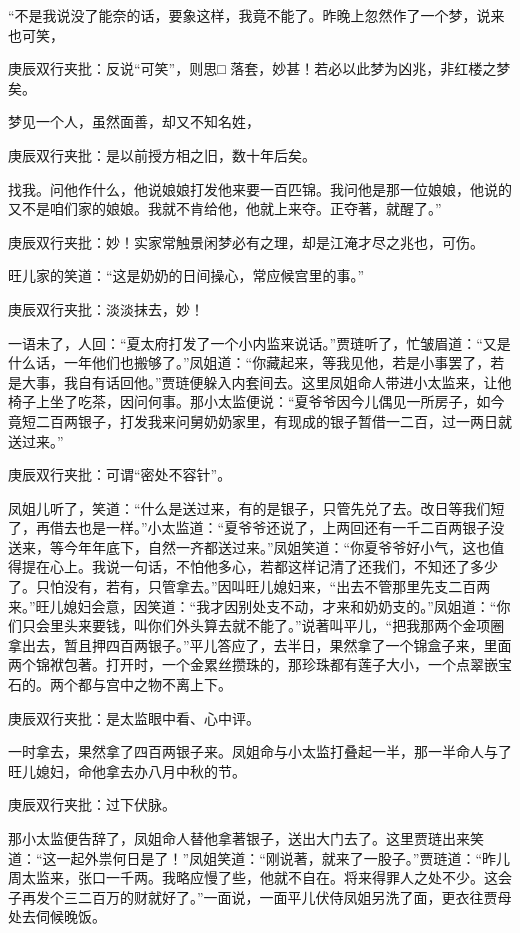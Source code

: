 \begin{parag}
“不是我说没了能奈的话，要象这样，我竟不能了。昨晚上忽然作了一个梦，说来也可笑，\begin{note}庚辰双行夹批：反说“可笑”，则思□ 落套，妙甚！若必以此梦为凶兆，非红楼之梦矣。\end{note}梦见一个人，虽然面善，却又不知名姓，\begin{note}庚辰双行夹批：是以前授方相之旧，数十年后矣。\end{note}找我。问他作什么，他说娘娘打发他来要一百匹锦。我问他是那一位娘娘，他说的又不是咱们家的娘娘。我就不肯给他，他就上来夺。正夺著，就醒了。”\begin{note}庚辰双行夹批：妙！实家常触景闲梦必有之理，却是江淹才尽之兆也，可伤。\end{note}旺儿家的笑道：“这是奶奶的日间操心，常应候宫里的事。”\begin{note}庚辰双行夹批：淡淡抹去，妙！\end{note}
\end{parag}


\begin{parag}


    一语未了，人回：“夏太府打发了一个小内监来说话。”贾琏听了，忙皱眉道：“又是什么话，一年他们也搬够了。”凤姐道：“你藏起来，等我见他，若是小事罢了，若是大事，我自有话回他。”贾琏便躲入内套间去。这里凤姐命人带进小太监来，让他椅子上坐了吃茶，因问何事。那小太监便说：“夏爷爷因今儿偶见一所房子，如今竟短二百两银子，打发我来问舅奶奶家里，有现成的银子暂借一二百，过一两日就送过来。”\begin{note}庚辰双行夹批：可谓“密处不容针”。\end{note}凤姐儿听了，笑道：“什么是送过来，有的是银子，只管先兑了去。改日等我们短了，再借去也是一样。”小太监道：“夏爷爷还说了，上两回还有一千二百两银子没送来，等今年年底下，自然一齐都送过来。”凤姐笑道：“你夏爷爷好小气，这也值得提在心上。我说一句话，不怕他多心，若都这样记清了还我们，不知还了多少了。只怕没有，若有，只管拿去。”因叫旺儿媳妇来，“出去不管那里先支二百两来。”旺儿媳妇会意，因笑道：“我才因别处支不动，才来和奶奶支的。”凤姐道：“你们只会里头来要钱，叫你们外头算去就不能了。”说著叫平儿，“把我那两个金项圈拿出去，暂且押四百两银子。”平儿答应了，去半日，果然拿了一个锦盒子来，里面两个锦袱包著。打开时，一个金累丝攒珠的，那珍珠都有莲子大小，一个点翠嵌宝石的。两个都与宫中之物不离上下。\begin{note}庚辰双行夹批：是太监眼中看、心中评。\end{note}一时拿去，果然拿了四百两银子来。凤姐命与小太监打叠起一半，那一半命人与了旺儿媳妇，命他拿去办八月中秋的节。\begin{note}庚辰双行夹批：过下伏脉。\end{note}那小太监便告辞了，凤姐命人替他拿著银子，送出大门去了。这里贾琏出来笑道：“这一起外祟何日是了！”凤姐笑道：“刚说著，就来了一股子。”贾琏道：“昨儿周太监来，张口一千两。我略应慢了些，他就不自在。将来得罪人之处不少。这会子再发个三二百万的财就好了。”一面说，一面平儿伏侍凤姐另洗了面，更衣往贾母处去伺候晚饭。
\end{parag}


